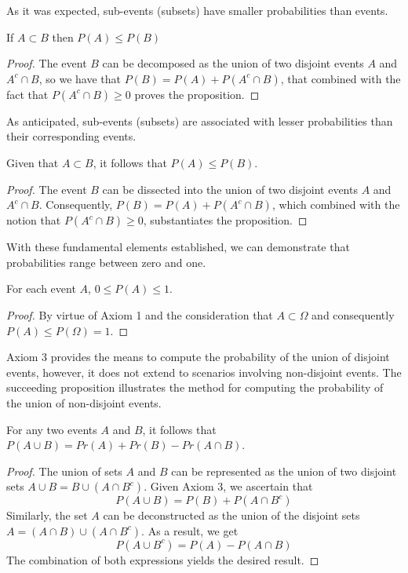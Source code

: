 As it was expected, sub-events (subsets) have smaller probabilities than events.

\begin{proposition}
If $A\subset B$ then $P \left( A \right) \leq P \left( B \right)$
\end{proposition}
\begin{proof}
The event $B$ can be decomposed as the union of two disjoint events $A$ and $A^c \cap B$, so we have that $P \left( B \right) = P \left( A \right) + P \left( A^c \cap B \right)$, that combined with the fact that  $P \left( A^c \cap B \right) \geq 0$ proves the proposition.
\end{proof}

As anticipated, sub-events (subsets) are associated with lesser probabilities than their corresponding events.

\begin{proposition}
Given that $A\subset B$, it follows that $P \left( A \right) \leq P \left( B \right)$.
\end{proposition}
\begin{proof}
The event $B$ can be dissected into the union of two disjoint events $A$ and $A^c \cap B$. Consequently, $P \left( B \right) = P \left( A \right) + P \left( A^c \cap B \right)$, which combined with the notion that  $P \left( A^c \cap B \right) \geq 0$, substantiates the proposition.
\end{proof}

With these fundamental elements established, we can demonstrate that probabilities range between zero and one.

\begin{proposition}
For each event $A$, $0 \leq P \left( A \right) \leq 1$.
\end{proposition}
\begin{proof}
By virtue of Axiom 1 and the consideration that $A \subset \Omega$ and consequently $P \left( A \right) \leq P \left( \Omega \right) = 1$.
\end{proof}

Axiom 3 provides the means to compute the probability of the union of disjoint events, however, it does not extend to scenarios involving non-disjoint events. The succeeding proposition illustrates the method for computing the probability of the union of non-disjoint events.

\begin{proposition}
For any two events $A$ and $B$, it follows that $P\left(A\cup B\right)=Pr\left(A\right)+Pr\left(B\right)-Pr\left(A\cap B\right)$.
\end{proposition}
\begin{proof}
The union of sets $A$ and $B$ can be represented as the union of two disjoint sets $A \cup B = B \cup \left( A \cap B^c \right)$. Given Axiom 3, we ascertain that
\[
P \left( A \cup B \right) = P \left( B \right) + P \left( A \cap B^c \right)
\]
Similarly, the set $A$ can be deconstructed as the union of the disjoint sets $A = \left( A \cap B \right) \cup \left( A \cap B^c \right)$. As a result, we get
\[
P \left( A \cup B^c \right) = P \left( A \right) - P \left( A \cap B \right)
\]
The combination of both expressions yields the desired result.
\end{proof}

